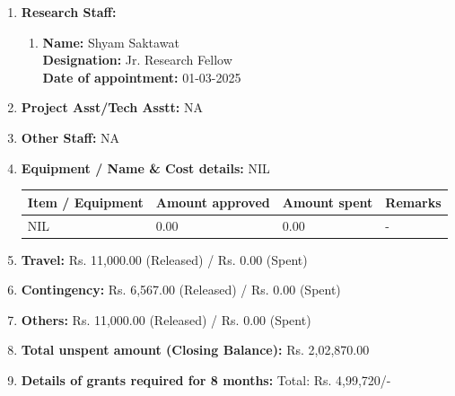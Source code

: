 \documentclass[11pt,a4paper]{article}
\begin{document}
\begin{enumerate}[label=\textbf{\arabic*.}]
    \item \textbf{Research Staff:}
    \begin{enumerate}[label=(\alph*)]
        \item \textbf{Name:} Shyam Saktawat \\
        \textbf{Designation:} Jr. Research Fellow \\
        \textbf{Date of appointment:} 01-03-2025
    \end{enumerate}

    \item \textbf{Project Asst/Tech Asstt:} NA

    \item \textbf{Other Staff:} NA

    \item \textbf{Equipment / Name \& Cost details:} NIL
    \begin{table}[h!]
        \centering
        \begin{tabular}{|p{}|p{}|p{}|p{}|}
            \hline
            \textbf{Item / Equipment} & \textbf{Amount approved} & \textbf{Amount spent} & \textbf{Remarks} \\
            \hline
            NIL & 0.00 & 0.00 & - \\
            \hline
        \end{tabular}
    \end{table}

    \item \textbf{Travel:} Rs. 11,000.00 (Released) / Rs. 0.00 (Spent)

    \item \textbf{Contingency:} Rs. 6,567.00 (Released) / Rs. 0.00 (Spent)

    \item \textbf{Others:} Rs. 11,000.00 (Released) / Rs. 0.00 (Spent)

    \item \textbf{Total unspent amount (Closing Balance):} Rs. 2,02,870.00

    \item \textbf{Details of grants required for 8 months:} Total: Rs. 4,99,720/-


\end{enumerate}
\end{document}
